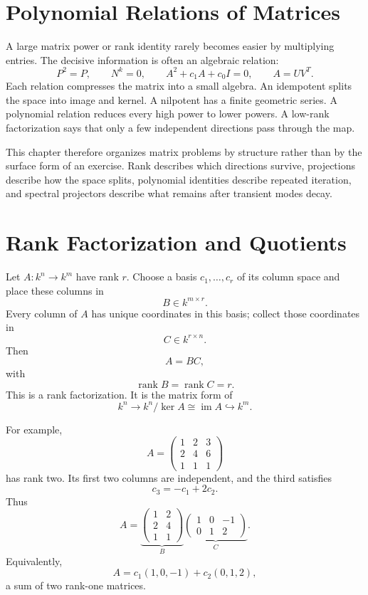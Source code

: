 
\section{Polynomial Relations of Matrices}

A large matrix power or rank identity rarely becomes easier by multiplying entries.  The decisive information is often an algebraic relation:
\[
  P^2=P,
  \qquad
  N^k=0,
  \qquad
  A^2+c_1A+c_0I=0,
  \qquad
  A=UV^T.
\]
Each relation compresses the matrix into a small algebra.  An idempotent splits the space into image and kernel.  A nilpotent has a finite geometric series.  A polynomial relation reduces every high power to lower powers.  A low-rank factorization says that only a few independent directions pass through the map.

This chapter therefore organizes matrix problems by structure rather than by the surface form of an exercise.  Rank describes which directions survive, projections describe how the space splits, polynomial identities describe repeated iteration, and spectral projectors describe what remains after transient modes decay.

\section{Rank Factorization and Quotients}

Let \(A:k^n\to k^m\) have rank \(r\).  Choose a basis \(c_1,\ldots,c_r\) of its column space and place these columns in
\[
  B\in k^{m\times r}.
\]
Every column of \(A\) has unique coordinates in this basis; collect those coordinates in
\[
  C\in k^{r\times n}.
\]
Then
\[
  \boxed{A=BC,}
\]
with
\[
  \operatorname{rank}B=\operatorname{rank}C=r.
\]
This is a rank factorization.  It is the matrix form of
\[
  k^n\longrightarrow k^n/\ker A
  \cong\operatorname{im}A
  \hookrightarrow k^m.
\]

For example,
\[
  A=
  \begin{pmatrix}
    1&2&3\\
    2&4&6\\
    1&1&1
  \end{pmatrix}
\]
has rank two.  Its first two columns are independent, and the third satisfies
\[
  c_3=-c_1+2c_2.
\]
Thus
\[
  A=
  \underbrace{
  \begin{pmatrix}
    1&2\\
    2&4\\
    1&1
  \end{pmatrix}}_{B}
  \underbrace{
  \begin{pmatrix}
    1&0&-1\\
    0&1&2
  \end{pmatrix}}_{C}.
\]
Equivalently,
\[
  A=c_1(1,0,-1)+c_2(0,1,2),
\]
a sum of two rank-one matrices.

